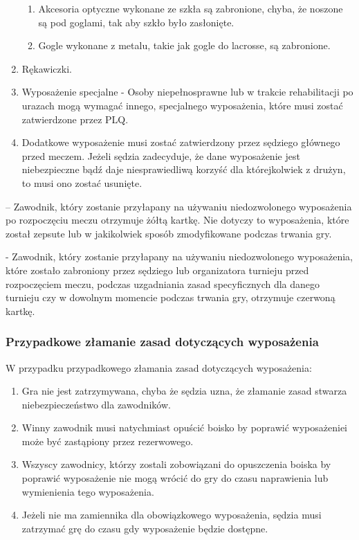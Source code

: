 \documentclass[12pt]{article}
\newcommand\redcard{\bgroup\color{red}\markoverwith{\textcolor{red}{\rule[-0.5ex]{2pt}{0.4pt}}}\ULon}
\newcommand\bluecard{\bgroup\color{blue}\markoverwith{\textcolor{blue}{\rule[-0.5ex]{2pt}{0.4pt}}}\ULon}
\begin{document}
\begin{enumerate}
	      \begin{enumerate}
		      \item
		            Akcesoria optyczne wykonane ze szkła są zabronione, chyba, że
		            noszone są pod goglami, tak aby szkło było zasłonięte.
		      \item
		            Gogle wykonane z metalu, takie jak gogle do lacrosse, są zabronione.
	      \end{enumerate}
	\item
	      Rękawiczki.
	\item
	      Wyposażenie specjalne - Osoby niepełnosprawne lub w trakcie
	      rehabilitacji po urazach mogą wymagać innego, specjalnego wyposażenia,
	      które musi zostać zatwierdzone przez PLQ.
	\item
	      Dodatkowe wyposażenie musi zostać zatwierdzony przez sędziego
	      głównego przed meczem. Jeżeli sędzia zadecyduje, że dane wyposażenie
	      jest niebezpieczne bądź daje niesprawiedliwą korzyść dla którejkolwiek
	      z drużyn, to musi ono zostać usunięte.
\end{enumerate}

\bluecard{Niebieska kartka} -- Zawodnik, który zostanie przyłapany na
używaniu niedozwolonego wyposażenia po rozpoczęciu meczu otrzymuje żółtą
kartkę. Nie dotyczy to wyposażenia, które został zepsute lub w
jakikolwiek sposób zmodyfikowane podczas trwania gry.

\redcard{Czerwona kartka} - Zawodnik, który zostanie przyłapany na używaniu
niedozwolonego wyposażenia, które zostało zabroniony przez sędziego lub
organizatora turnieju przed rozpoczęciem meczu, podczas uzgadniania
zasad specyficznych dla danego turnieju czy w dowolnym momencie podczas
trwania gry, otrzymuje czerwoną kartkę.

\subsubsection{Przypadkowe złamanie zasad dotyczących wyposażenia}
W przypadku przypadkowego złamania zasad dotyczących wyposażenia:

\begin{enumerate}
	\item
	      Gra nie jest zatrzymywana, chyba że sędzia uzna, że złamanie zasad
	      stwarza niebezpieczeństwo dla zawodników.
	\item
	      Winny zawodnik musi natychmiast opuścić boisko by poprawić
	      wyposażeniei może być zastąpiony przez rezerwowego.
	\item
	      Wszyscy zawodnicy, którzy zostali zobowiązani do opuszczenia boiska by
	      poprawić wyposażenie nie mogą wrócić do gry do czasu naprawienia lub
	      wymienienia tego wyposażenia.
	\item
	      Jeżeli nie ma zamiennika dla obowiązkowego wyposażenia, sędzia musi
	      zatrzymać grę do czasu gdy wyposażenie będzie dostępne.
\end{enumerate}
\end{document}
